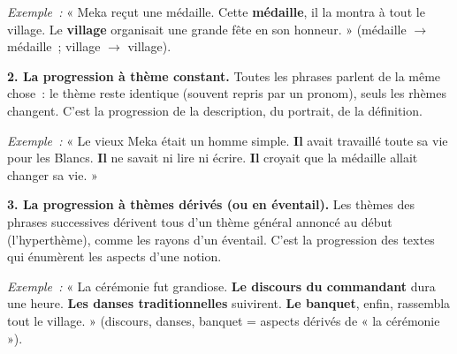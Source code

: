 \documentclass[11pt]{article}
\begin{document}
\emph{Exemple~:} « Meka reçut une médaille. Cette \textbf{médaille}, il la montra à tout le village. Le \textbf{village} organisait une grande fête en son honneur. » (médaille $\rightarrow$ médaille~; village $\rightarrow$ village).

\textbf{2. La progression à thème constant.} Toutes les phrases parlent de la même chose~: le thème reste identique (souvent repris par un pronom), seuls les rhèmes changent. C'est la progression de la description, du portrait, de la définition.

\emph{Exemple~:} « Le vieux Meka était un homme simple. \textbf{Il} avait travaillé toute sa vie pour les Blancs. \textbf{Il} ne savait ni lire ni écrire. \textbf{Il} croyait que la médaille allait changer sa vie. »

\textbf{3. La progression à thèmes dérivés (ou en éventail).} Les thèmes des phrases successives dérivent tous d'un thème général annoncé au début (l'hyperthème), comme les rayons d'un éventail. C'est la progression des textes qui énumèrent les aspects d'une notion.

\emph{Exemple~:} « La cérémonie fut grandiose. \textbf{Le discours du commandant} dura une heure. \textbf{Les danses traditionnelles} suivirent. \textbf{Le banquet}, enfin, rassembla tout le village. » (discours, danses, banquet = aspects dérivés de « la cérémonie »).
\end{document}
